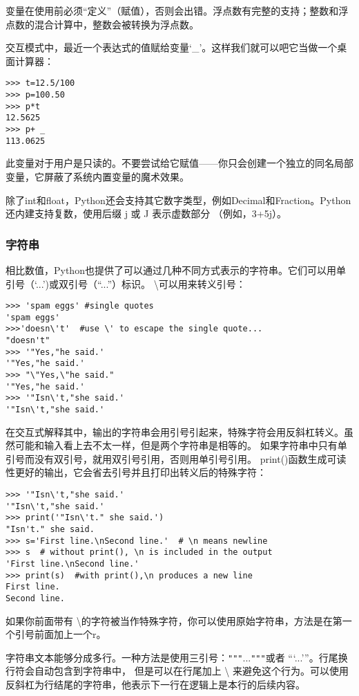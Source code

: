 \documentclass[UTF8]{ctexart}
\begin{document}
变量在使用前必须“定义”（赋值），否则会出错。浮点数有完整的支持；整数和浮点数的混合计算中，整数会被转换为浮点数。

交互模式中，最近一个表达式的值赋给变量`\_'。这样我们就可以吧它当做一个桌面计算器：

\begin{verbatim}
>>> t=12.5/100
>>> p=100.50
>>> p*t
12.5625
>>> p+ _
113.0625
\end{verbatim}

此变量对于用户是只读的。不要尝试给它赋值——你只会创建一个独立的同名局部变量，它屏蔽了系统内置变量的魔术效果。

除了int和float，Python还会支持其它数字类型，例如Decimal和Fraction。Python还内建支持复数，使用后缀 j 或 J 表示虚数部分
（例如，3+5j）。
\subsubsection{字符串}
相比数值，Python也提供了可以通过几种不同方式表示的字符串。它们可以用单引号（`...')或双引号（``...''）标识。
 \textbackslash 可以用来转义引号：
\begin{verbatim}
>>> 'spam eggs' #single quotes
'spam eggs'
>>>'doesn\'t'  #use \' to escape the single quote...
"doesn't"
>>> '"Yes,"he said.'
'"Yes,"he said.'
>>> "\"Yes,\"he said."
'"Yes,"he said.'
>>> '"Isn\'t,"she said.'
'"Isn\'t,"she said.'
\end{verbatim}

在交互式解释其中，输出的字符串会用引号引起来，特殊字符会用反斜杠转义。虽然可能和输入看上去不太一样，但是两个字符串是相等的。
如果字符串中只有单引号而没有双引号，就用双引号引用，否则用单引号引用。
print()函数生成可读性更好的输出，它会省去引号并且打印出转义后的特殊字符：
\begin{verbatim}
>>> '"Isn\'t,"she said.'
'"Isn\'t,"she said.'
>>> print('"Isn\'t." she said.')
"Isn't." she said.
>>> s='First line.\nSecond line.'  # \n means newline
>>> s  # without print(), \n is included in the output
'First line.\nSecond line.'
>>> print(s)  #with print(),\n produces a new line
First line.
Second line.
\end{verbatim}

如果你前面带有 \textbackslash 的字符被当作特殊字符，你可以使用原始字符串，方法是在第一个引号前面加上一个r。

字符串文本能够分成多行。一种方法是使用三引号：\verb|"""|...\verb|"""|或者 ```...'''。行尾换行符会自动包含到字符串中，
但是可以在行尾加上 \textbackslash
来避免这个行为。可以使用反斜杠为行结尾的字符串，他表示下一行在逻辑上是本行的后续内容。
\end{document}
